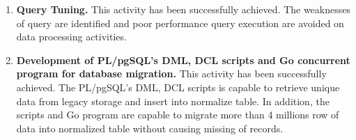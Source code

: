 \begin{enumerate}[topsep=0pt,itemsep=-1ex,partopsep=1ex,parsep=1.5ex]
	\item \textbf{Query Tuning.} This activity has been successfully achieved. The weaknesses of query are identified and poor performance query execution are avoided on data processing activities. 
	
	\item \textbf{Development of PL/pgSQL's DML, DCL scripts and Go concurrent program for database migration.} This activity has been successfully achieved. The PL/pgSQL's DML, DCL scripts is capable to retrieve unique data from legacy storage and insert into normalize table. In addition, the scripts and Go program are capable to migrate more than 4 millions row of data into normalized table without causing missing of records. 
	
\end{enumerate}

